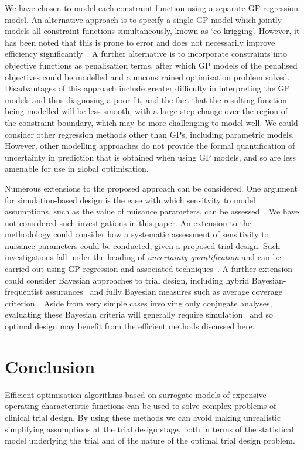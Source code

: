 \documentclass{article} %
\begin{document}
We have chosen to model each constraint function using a separate GP regression model. An alternative approach is to specify a single GP model which jointly models all constraint functions simultaneously, known as `co-krigging'. However, it has been noted that this is prone to error and does not necessarily improve efficiency significantly~\cite{}. A further alternative is to incorporate constraints into objective functions as penalisation terms, after which GP models of the penalised objectives could be modelled and a unconstrained optimisation problem solved. Disadvantages of this approach include greater difficulty in interpreting the GP models and thus diagnosing a poor fit, and the fact that the resulting function being modelled will be less smooth, with a large step change over the region of the constraint boundary, which may be more challenging to model well. We could consider other regression methods other than GPs, including parametric models. However, other modelling approaches do not provide the formal quantification of uncertainty in prediction that is obtained when using GP models, and so are less amenable for use in global optimisation. 

Numerous extensions to the proposed approach can be considered. One argument for simulation-based design is the ease with which sensitvity to model assumptions, such as the value of nuisance parameters, can be assessed~\cite{Landau2013}. We have not considered such investigations in this paper. An extension to the methodology could consider how a systematic assessment of sensitivity to nuisance parameters could be conducted, given a proposed trial design. Such investigations fall under the heading of \emph{uncertainty quantification} and can be carried out using GP regression and associated techniques~\cite{Kennedy2001}. A further extension could consider Bayesian approaches to trial design, including hybrid Bayesian-frequentist assurances~\cite{OHagan2005} and fully Bayesian measures such as average coverage criterion~\cite{Cao2009}. Aside from very simple cases involving only conjugate analyses, evaluating these Bayesian criteria will generally require simulation~\cite{OHagan2005} and so optimal design may benefit from the efficient methods discussed here.

\section{Conclusion}

Efficient optimisation algorithms based on surrogate models of expensive operating characteristic functions can be used to solve complex problems of clinical trial design. By using these methods we can avoid making unrealistic simplifying assumptions at the trial design stage, both in terms of the statistical model underlying the trial and of the nature of the optimal trial design problem.
\end{document}
